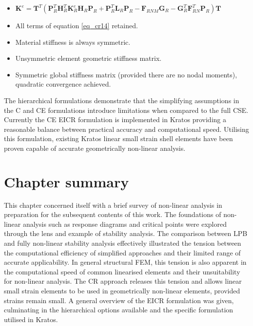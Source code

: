\begin{itemize}
 		\begin{itemize}
 		\item $\mathbf{K}^e 
 		=
 		\mathbf{T}^T
 		(
 		\mathbf{P}_R^T
 		\mathbf{H}_R^T
 		\mathbf{K}_R^e
 		\mathbf{H}_R
 		\mathbf{P}_R
 		+
 		\mathbf{P}_R^T
 		\mathbf{L}_R
 		\mathbf{P}_R
 		-
 		\mathbf{F}_{RNM}
 		\mathbf{G}_R
 		-
 		\mathbf{G}_R^T
 		\mathbf{F}_{RN}^T
 		\mathbf{P}_R
 		)
 		\mathbf{T}$
 		\item All terms of equation \ref{eq_cr14} retained. 
 		\item Material stiffness is always symmetric.
 		\item Unsymmetric element geometric stiffness matrix.
 		\item Symmetric global stiffness matrix (provided there are no nodal moments), quadratic convergence achieved.
 	\end{itemize}
 \end{itemize}

The hierarchical formulations demonstrate that the simplifying assumptions in the C and CE formulations introduce limitations when compared to the full CSE. Currently the CE EICR formulation is implemented in Kratos providing a reasonable balance between practical accuracy and computational speed. Utilising this formulation, existing Kratos linear small strain shell elements have been proven capable of accurate geometrically non-linear analysis.

\section{Chapter summary}
This chapter concerned itself with a brief survey of non-linear analysis in preparation for the subsequent contents of this work. The foundations of non-linear analysis such as response diagrams and critical points were explored through the lens and example of stability analysis. The comparison between LPB and fully non-linear stability analysis effectively illustrated the tension between the computational efficiency of simplified approaches and their limited range of accurate applicability. In general structural FEM, this tension is also apparent in the computational speed of common linearised elements and their unsuitability for non-linear analysis. The CR approach releases this tension and allows linear small strain elements to be used in geometrically non-linear elements, provided strains remain small. A general overview of the EICR formulation was given, culminating in the hierarchical options available and the specific formulation utilised in Kratos.